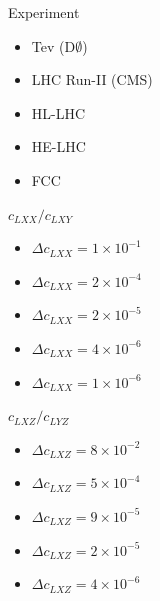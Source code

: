 \documentclass[a4paper,11pt,twoside,french]{article}
\begin{document}
        \begin{multicols}{3}
            Experiment
        				\begin{itemize}[label=$\triangleright$]
            				\item Tev (D$\emptyset$)
            				\item LHC Run-II (CMS)
            				\item HL-LHC 
            				\item HE-LHC 
            				\item FCC 
        				\end{itemize}
            $c_{LXX} / c_{LXY}  $
        				\begin{itemize}[label=$\triangleright$]
            				\item $ \Delta c_{LXX} =1\times 10^{-1} $ 
            				\item $\Delta c_{LXX} =2\times 10^{-4} $
            				\item $\Delta c_{LXX} =2\times 10^{-5} $
            				\item $\Delta c_{LXX} =4\times 10^{-6} $
            				\item $\Delta c_{LXX} =1\times 10^{-6} $
        				\end{itemize}
            $c_{LXZ}  / c_{LYZ} $
   \begin{itemize}[label=$\triangleright$]
            				\item $\Delta c_{LXZ} =8\times 10^{-2} $
            				\item $\Delta c_{LXZ} =5\times 10^{-4} $
            				\item $\Delta c_{LXZ} =9\times 10^{-5} $
            				\item $\Delta c_{LXZ} =2\times 10^{-5} $
            				\item $\Delta c_{LXZ} =4\times 10^{-6} $
   \end{itemize}
        \end{multicols}
\end{document}
